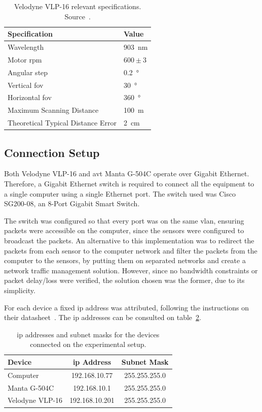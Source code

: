 \begin{table}[H]
	\renewcommand{\arraystretch}{1.2}
	\centering
	\begin{tabular}{@{}p{8.3cm}l@{}}
		\toprule
		Specification & Value \\ \midrule
		Wavelength    & \SI{903}{\nano\meter} \\
		Motor \acs{rpm} & $600 \pm 3$ \\
		Angular step & \SI{0.2}{\degree} \\
		Vertical \ac{fov} & \SI{30}{\degree} \\
		Horizontal \ac{fov} & \SI{360}{\degree} \\
		Maximum Scanning Distance & \SI{100}{\meter} \\
		Theoretical Typical Distance Error & \SI{2}{\centi\meter} \\
		\bottomrule
	\end{tabular}
	\caption{Velodyne VLP-16 relevant specifications. Source~\cite{VLP16}.}
	\label{tab:vlp16-specs}
\end{table}


\subsection{Connection Setup} 
Both Velodyne VLP-16 and \ac{avt} Manta G-504C operate over Gigabit Ethernet. Therefore, a Gigabit  Ethernet switch is required to connect all the equipment to a single computer using a single Ethernet port. The switch used was Cisco SG200-08, an 8-Port Gigabit Smart Switch. 

The switch was configured so that every port was on the same \ac{vlan}, ensuring packets were accessible on the computer, since the sensors were configured to broadcast the packets. An alternative to this implementation was to redirect the packets from each sensor to the computer network and filter the packets from the computer to the sensors, by putting them on separated networks and create a network traffic management solution. However, since no bandwidth constraints or packet delay/loss were verified, the solution chosen was the former, due to its simplicity. 

For each device a fixed \acf{ip} address was attributed, following the instructions on their datasheet~\cite{VLP16, MantaVision2013}. The \ac{ip} addresses can be consulted on table~\ref{tab:experimental-setup-ip}.

\begin{table}[H]
	\renewcommand{\arraystretch}{1.2}
	\centering
	\begin{tabular}{@{}lcc@{}}
		\toprule
		Device          & \ac{ip} Address & Subnet Mask\\ \midrule
		Computer        & 192.168.10.77  & 255.255.255.0 \\
		Manta G-504C    & 192.168.10.1   & 255.255.255.0 \\
		Velodyne VLP-16 & 192.168.10.201 & 255.255.255.0 \\
		\bottomrule
	\end{tabular}
	\caption{\ac{ip} addresses and subnet masks for the devices connected on the experimental setup.}
	\label{tab:experimental-setup-ip}
\end{table}

